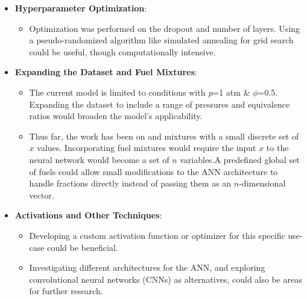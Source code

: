 \documentclass[12pt]{report}
\begin{document}
\begin{itemize}
    \item \textbf{Hyperparameter Optimization}:
    \begin{itemize}
        \item Optimization was performed on the dropout and number of layers. Using a pseudo-randomized algorithm like simulated annealing for grid search could be useful, though computationally intensive.
    \end{itemize}

    \item \textbf{Expanding the Dataset and Fuel Mixtures}:
    \begin{itemize}
        \item The current model is limited to conditions with \textit{p}=1 atm \& $\phi$=0.5. Expanding the dataset to include a range of pressures and equivalence ratios would broaden the model's applicability.
        \item Thus far, the work has been on  and  mixtures with a small discrete set of \(x\) values. Incorporating fuel mixtures would require the input \( x \) to the neural network would become a set of \( n \) variables.A predefined global set of fuels could allow small modifications to the ANN architecture to handle fractions directly instead of passing them as an \( n \)-dimensional vector.
    \end{itemize}
  

    \item \textbf{Activations and Other Techniques}:
    \begin{itemize}
        \item Developing a custom activation function or optimizer for this specific use-case could be beneficial. 
        \item Investigating different architectures for the ANN, and exploring convolutional neural networks (CNNs) as alternatives, could also be areas for further research.
    \end{itemize}
\end{itemize}




\newpage
\end{document}

